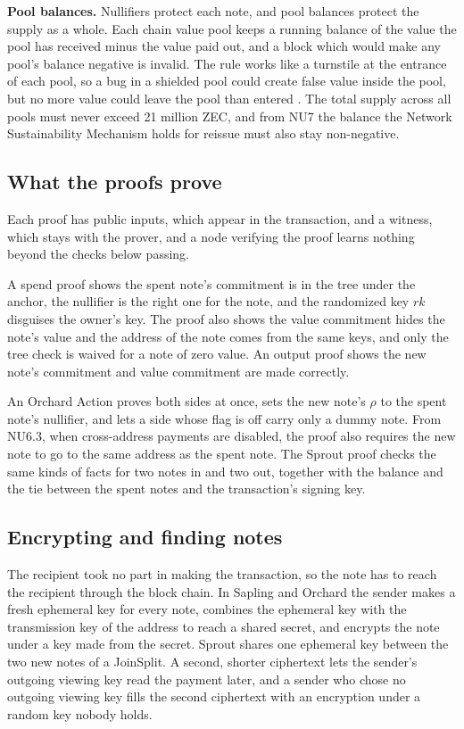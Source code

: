 \documentclass{article}
\let\oldcite\cite
\renewcommand{\cite}[2][]{\raisebox{0ex}{\oldcite[{#1}]{#2}}}
\newcommand{\lsubsection}[2]{\def\sectionlabel{#2} \subsection{#1}\label{#2}}
\theoremstyle{labelledtheorem} %
\begin{document}
\textbf{Pool balances.} Nullifiers protect each note, and pool balances protect the supply as a whole. Each chain value pool keeps a running balance of the value the pool has received minus the value paid out, and a block which would make any pool's balance negative is invalid. The rule works like a turnstile at the entrance of each pool, so a bug in a shielded pool could create false value inside the pool, but no more value could leave the pool than entered \cite{ZIP-209}. The total supply across all pools must never exceed 21 million ZEC, and from NU7 the balance the Network Sustainability Mechanism holds for reissue must also stay non-negative.

\lsubsection{What the proofs prove}{readableproofs}
\label{spendstatement}\label{sproutnullifierintegrity}\label{sproutspendauthority}%

Each proof has public inputs, which appear in the transaction, and a witness, which stays with the prover, and a node verifying the proof learns nothing beyond the checks below passing.

A spend proof shows the spent note's commitment is in the tree under the anchor, the nullifier is the right one for the note, and the randomized key $\mathit{rk}$ disguises the owner's key. The proof also shows the value commitment hides the note's value and the address of the note comes from the same keys, and only the tree check is waived for a note of zero value. An output proof shows the new note's commitment and value commitment are made correctly.

An Orchard Action proves both sides at once, sets the new note's $\rho$ to the spent note's nullifier, and lets a side whose flag is off carry only a dummy note. From NU6.3, when cross-address payments are disabled, the proof also requires the new note to go to the same address as the spent note. The Sprout proof checks the same kinds of facts for two notes in and two out, together with the balance and the tie between the spent notes and the transaction's signing key.

\lsubsection{Encrypting and finding notes}{readableencryption}
\label{decryptivk}\label{decryptovk}\label{saplingandorchardencrypt}\label{saplingandorchardinband}\label{saplinginband}\label{sproutinband}%

The recipient took no part in making the transaction, so the note has to reach the recipient through the block chain. In Sapling and Orchard the sender makes a fresh ephemeral key for every note, combines the ephemeral key with the transmission key of the address to reach a shared secret, and encrypts the note under a key made from the secret. Sprout shares one ephemeral key between the two new notes of a JoinSplit. A second, shorter ciphertext lets the sender's outgoing viewing key read the payment later, and a sender who chose no outgoing viewing key fills the second ciphertext with an encryption under a random key nobody holds.
\end{document}
